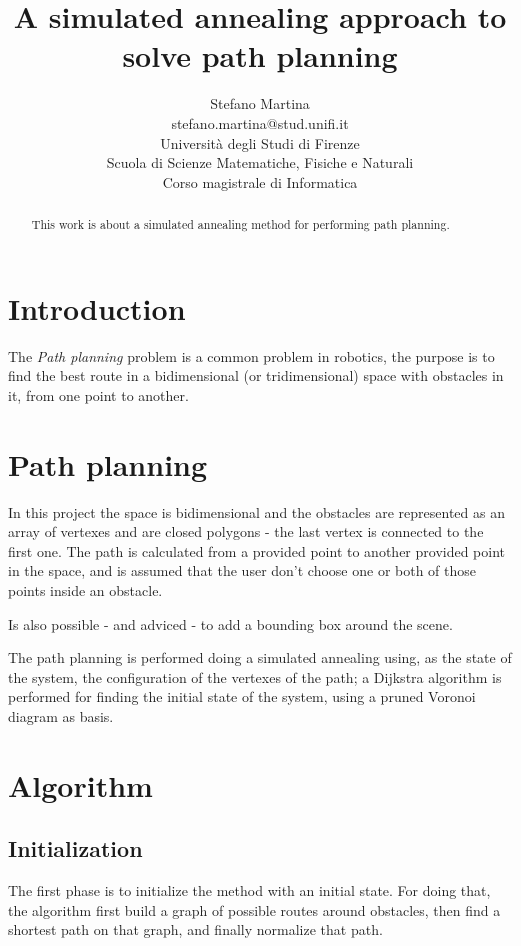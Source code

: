 \documentclass[a4paper]{article}
\author{
  {\Large Stefano Martina}\\
  {\small stefano.martina@stud.unifi.it}\\
  Universit\`a degli Studi di Firenze\\
  Scuola di Scienze Matematiche, Fisiche e Naturali\\
  Corso magistrale di Informatica
}
\title{{\Huge\bfseries A simulated annealing approach to solve path
    planning}}%
\begin{document}
\maketitle
\thispagestyle{empty}
\vfill
\begin{abstract}
  This work is about a simulated annealing method for performing path
  planning.
\end{abstract}

\section{Introduction}
The \emph{Path planning} problem is a common problem in robotics, the
purpose is to find the best route in a bidimensional (or
tridimensional) space with obstacles in it, from one point to
another.

\section{Path planning}
In this project the space is bidimensional and the obstacles are
represented as an array of vertexes and are closed polygons - the last
vertex is connected to the first one. The path is calculated from a
provided point to another provided point in the space, and is assumed
that the user don't choose one or both of those points inside an
obstacle.

Is also possible - and adviced - to add a bounding box around the
scene.

The path planning is performed doing a simulated annealing using, as the state of the system, the
configuration of the vertexes of the path; a Dijkstra algorithm is
performed for finding the initial state of the system, using a pruned 
Voronoi diagram as basis.

\section{Algorithm}
\subsection{Initialization}
The first phase is to initialize the method with an initial state. For
doing that, the algorithm first build a graph of possible routes
around obstacles, then find a shortest path on that graph, and finally
normalize that path.
\end{document}
